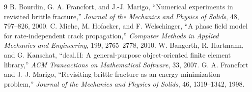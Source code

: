 \documentclass[11pt,a4paper]{report}
\begin{document}
\begin{thebibliography}{9}
 B. Bourdin, G. A. Francfort, and J.-J. Marigo, ``Numerical experiments in revisited brittle fracture,'' \emph{Journal of the Mechanics and Physics of Solids}, 48, 797--826, 2000.
 C. Miehe, M. Hofacker, and F. Welschinger, ``A phase field model for rate-independent crack propagation,'' \emph{Computer Methods in Applied Mechanics and Engineering}, 199, 2765--2778, 2010.
 W. Bangerth, R. Hartmann, and G. Kanschat, ``deal.II: A general-purpose object-oriented finite element library,'' \emph{ACM Transactions on Mathematical Software}, 33, 2007.
 G. A. Francfort and J.-J. Marigo, ``Revisiting brittle fracture as an energy minimization problem,'' \emph{Journal of the Mechanics and Physics of Solids}, 46, 1319--1342, 1998.
\end{thebibliography}
\end{document}
